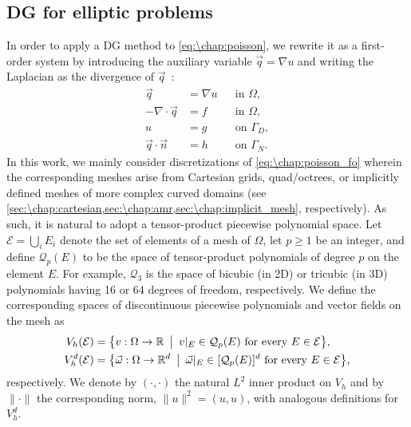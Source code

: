 \subsection{DG for elliptic problems}
In order to apply a DG method to \cref{eq:\chap:poisson}, we rewrite it as a first-order system by introducing the auxiliary variable $\vec{q} = \nabla u$ and writing the Laplacian as the divergence of $\vec{q}$~\cite{Arnold_02_01}:
\begin{equation}\label{eq:\chap:poisson_fo}
\begin{aligned}
\vec{q} &= \nabla u &&\text{in } \Omega, \\
-\nabla \cdot \vec{q} &= f &&\text{in } \Omega, \\
u &= g &&\text{on } \Gamma_D, \\
\vec{q} \cdot \vec{n} &= h &&\text{on } \Gamma_N.
\end{aligned}
\end{equation}
%
In this work, we mainly consider discretizations of \cref{eq:\chap:poisson_fo} wherein the corresponding meshes arise from Cartesian grids, quad/octrees, or implicitly defined meshes of more complex curved domains (see \cref{sec:\chap:cartesian,sec:\chap:amr,sec:\chap:implicit_mesh}, respectively). As such, it is natural to adopt a tensor-product piecewise polynomial space. Let $\mathcal E = \bigcup_i E_i$ denote the set of elements of a mesh of $\Omega$, let $p \geq 1$ be an integer, and define $\mathcal Q_p(E)$ to be the space of tensor-product polynomials of degree $p$ on the element $E$. For example, $\mathcal Q_3$ is the space of bicubic (in 2D) or tricubic (in 3D) polynomials having 16 or 64 degrees of freedom, respectively.
We define the corresponding spaces of discontinuous piecewise polynomials and vector fields on the mesh as
\begin{align}
V_h(\mathcal{E}) &= \big\{ v : \Omega \to \mathbb{R} \enskip\bigl|\enskip v|_E \in {\mathcal Q}_p(E) \text{ for every } E \in {\mathcal E} \bigr\}, \\
V_h^d(\mathcal{E}) &= \big\{ \vec{\omega} : \Omega \to \mathbb{R}^d \enskip\bigl|\enskip \vec{\omega}|_E \in [{\mathcal Q}_p(E)]^d \text{ for every } E \in {\mathcal E} \bigr\},
\end{align}
respectively. We denote by $(\cdot,\cdot)$ the natural $L^2$ inner product on $V_h$ and by $\| \cdot \|$ the corresponding norm, $\|u\|^2 = (u,u)$, with analogous definitions for $V_h^d$.

